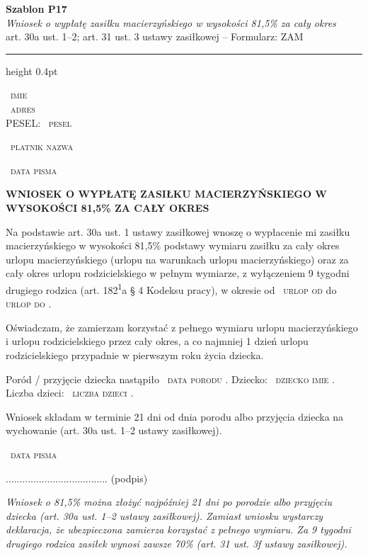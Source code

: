 \documentclass[11pt,a4paper]{article}
\newcommand{\Pole}[1]{%
  \textcolor{szary}{\dotfill}\,%
  {\scriptsize\textcolor{szary}{\textsc{#1}}}%
}
\newcommand{\NaglowekPisma}[1]{%
  \par\vspace{0.8em}%
  \begin{center}%
    {\large\bfseries\MakeUppercase{#1}}%
  \end{center}%
  \vspace{0.4em}%
}
\begin{document}
\begin{flushright}
{\footnotesize\color{szary}
\textbf{Szablon P17}\\
{\itshape Wniosek o wypłatę zasiłku macierzyńskiego w wysokości 81,5\% za cały okres}\\
art. 30a ust. 1--2; art. 31 ust. 3 ustawy zasiłkowej -- Formularz: ZAM}\
\end{flushright}

\vspace{0.5em}
{\color{ramka}\hrule height 0.4pt}
\vspace{0.8em}

\Pole{imie}\\[-2pt]
\Pole{adres}\\[-2pt]
PESEL: \Pole{pesel}

\Pole{platnik nazwa}

\Pole{data pisma}

\NaglowekPisma{WNIOSEK O WYPŁATĘ ZASIŁKU MACIERZYŃSKIEGO W WYSOKOŚCI 81,5\% ZA CAŁY OKRES}

Na podstawie art. 30a ust. 1 ustawy zasiłkowej wnoszę o wypłacenie mi
zasiłku macierzyńskiego w wysokości 81,5\% podstawy wymiaru zasiłku
za cały okres urlopu macierzyńskiego (urlopu na warunkach urlopu
macierzyńskiego) oraz za cały okres urlopu rodzicielskiego
w pełnym wymiarze, z wyłączeniem 9 tygodni drugiego rodzica
(art. 182\textsuperscript{1}a \S{} 4 Kodeksu pracy), w okresie od \Pole{urlop od} do \Pole{urlop do}.

Oświadczam, że zamierzam korzystać z pełnego wymiaru urlopu
macierzyńskiego i urlopu rodzicielskiego przez cały okres, a co najmniej
1 dzień urlopu rodzicielskiego przypadnie w pierwszym roku życia dziecka.

Poród / przyjęcie dziecka nastąpiło \Pole{data porodu}.
Dziecko: \Pole{dziecko imie}. Liczba dzieci: \Pole{liczba dzieci}.

Wniosek składam w terminie 21 dni od dnia porodu albo przyjęcia
dziecka na wychowanie (art. 30a ust. 1--2 ustawy zasiłkowej).

\Pole{data pisma}
.....................................
(podpis)

\vfill
{\footnotesize\textcolor{szary}\itshape Wniosek o 81,5\% można złożyć najpóźniej 21 dni po porodzie albo przyjęciu dziecka (art. 30a ust. 1--2 ustawy zasiłkowej). Zamiast wniosku wystarczy deklaracja, że ubezpieczona zamierza korzystać z pełnego wymiaru. Za 9 tygodni drugiego rodzica zasiłek wynosi zawsze 70\% (art. 31 ust. 3f ustawy zasiłkowej). }
\end{document}
